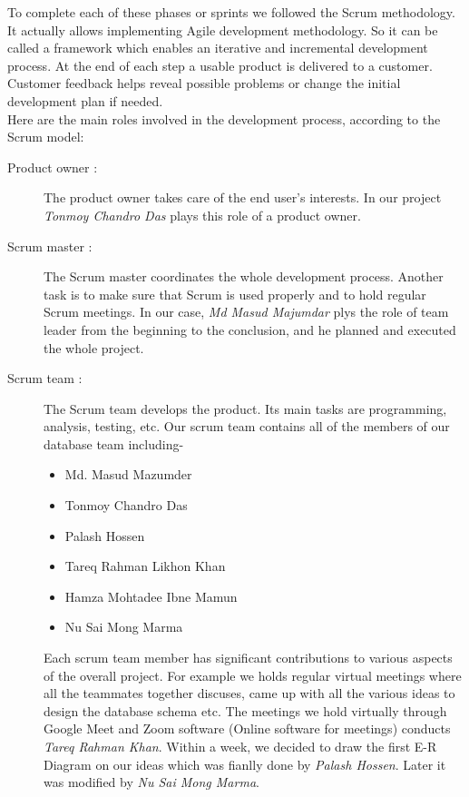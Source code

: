 To complete each of these phases or sprints we followed the Scrum methodology. It actually allows implementing Agile development methodology. So it can be called a framework which enables an iterative and incremental development process. At the end of each step a usable product is delivered to a customer. Customer feedback helps reveal possible problems or change the initial development plan if needed.\\
Here are the main roles involved in the development process, according to the Scrum model:
\begin{description}
\item[Product owner :] The product owner takes care of the end user’s interests. In our project \textit{Tonmoy Chandro Das} plays this role of a product owner. 

\item[Scrum master :] The Scrum master coordinates the whole development process. Another task is to make sure that Scrum is used properly and to hold regular Scrum meetings. In our case, \textit{Md Masud Majumdar} plys the role of team leader from the beginning to the conclusion, and he planned and executed the whole project.

\item[Scrum team :] The Scrum team develops the product. Its main tasks are programming, analysis, testing, etc. Our scrum team contains all of the members of our database team including-
\begin{itemize}
\item Md. Masud Mazumder
\item Tonmoy Chandro Das
\item Palash Hossen
\item Tareq Rahman Likhon Khan
\item Hamza Mohtadee Ibne Mamun
\item Nu Sai Mong Marma
\end{itemize}

Each scrum team member has significant contributions to various aspects of the overall project. For example we holds regular virtual meetings where all the teammates together discuses, came up with all the various ideas to design the database schema etc. The meetings we hold virtually through Google Meet and Zoom software (Online software for meetings) conducts \textit{Tareq Rahman Khan}. Within a week, we decided to draw the first E-R Diagram on our ideas which was fianlly done by \textit{Palash Hossen}. Later it was modified by \textit{Nu Sai Mong Marma}.\\


\end{description}
